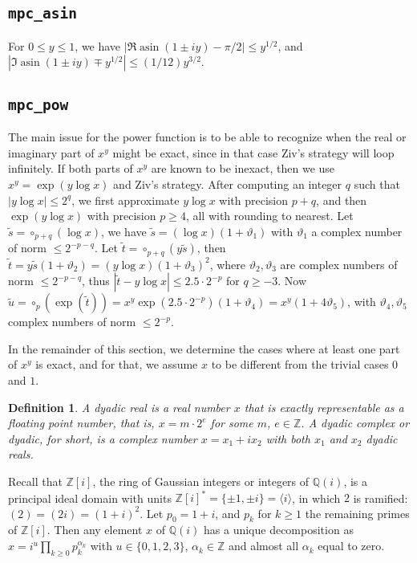 \documentclass [11pt]{article}
\newcommand {\asin}{\operatorname {asin}}
\newcommand {\round}{\operatorname {\circ}}
\newcommand {\Z}{\mathbb Z}
\newcommand {\Q}{\mathbb Q}
\renewcommand {\theta}{\vartheta}
\renewcommand {\leq}{\leqslant}
\renewcommand {\geq}{\geqslant}
\newtheorem{definition}[theorem]{Definition}
\begin{document}
\subsection {\texttt {mpc\_asin}}

For $0 \leq y \leq 1$, we have $|\Re \asin (1 \pm iy) - \pi/2|
\leq y^{1/2}$, and $|\Im \asin (1 \pm iy) \mp y^{1/2}| \leq (1/12) y^{3/2}$.

\subsection {\texttt {mpc\_pow}}

The main issue for the power function is to be able to recognize when the
real or imaginary part of $x^y$ might be exact, since in that case
Ziv's strategy will loop infinitely.
If both parts of $x^y$ are known to be inexact, then we use
$x^y = \exp(y \log x)$ and Ziv's strategy.
After computing an integer $q$ such that $|y \log x| \leq 2^q$, we first
approximate $y \log x$ with precision $p + q$, and then
$\exp(y \log x)$ with precision $p \geq 4$, all with rounding
to nearest.
Let $\tilde{s} = \round_{p+q}(\log x)$,
we have $\tilde{s} = (\log x) (1 + \theta_1)$
with $\theta_1$ a complex number of norm $\leq 2^{-p-q}$.
Let $\tilde{t} = \round_{p+q}(y \tilde{s})$, then
$\tilde{t} = y \tilde{s} (1 + \theta_2) = (y \log x) (1 + \theta_3)^2$,
where $\theta_2, \theta_3$ are complex numbers of norm $\leq 2^{-p-q}$,
thus $|\tilde{t} - y \log x| \leq 2.5 \cdot 2^{-p}$ for $q \geq -3$.
Now $\tilde{u} = \round_p(\exp(\tilde{t})) =
x^y \exp(2.5 \cdot 2^{-p}) (1 + \theta_4) = x^y (1 + 4 \theta_5)$,
with $\theta_4, \theta_5$ complex numbers of norm $\leq 2^{-p}$.

In the remainder of this section, we determine the cases where at
least one part of $x^y$ is exact, and for that, we assume $x$ to be
different from the trivial cases $0$ and $1$.

\begin {definition}
A {\em dyadic real} is a real number $x$ that is exactly representable
as a floating point number, that is, $x = m \cdot 2^e$ for some $m$, $e \in \Z$.
A {\em dyadic complex} or {\em dyadic}, for short, is a complex number
$x = x_1 + i x_2$ with both $x_1$ and $x_2$ dyadic reals.
\end {definition}

Recall that $\Z [i]$, the ring of Gaussian integers or integers of $\Q (i)$,
is a principal ideal domain with units
$\Z [i]^\ast = \{ \pm 1, \pm i \} = \langle i \rangle$,
in which $2$ is ramified: $(2) = (2 i) = (1 + i)^2$. Let $p_0 = 1 + i$, and
$p_k$ for $k \geq 1$ the remaining primes of $\Z [i]$. Then any element
$x$ of $\Q (i)$ has a unique decomposition as
$x = i^u \prod_{k \geq 0} p_k^{\alpha_k}$ with $u \in \{ 0, 1, 2, 3\}$,
$\alpha_k \in \Z$ and almost all $\alpha_k$ equal to zero.
\end{document}
